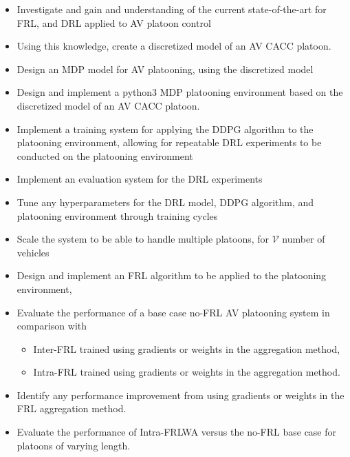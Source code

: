 \begin{itemize}
    \item Investigate and gain and understanding of the current state-of-the-art for FRL, and DRL
    applied to AV platoon control
    \item Using this knowledge, create a discretized model of an AV CACC platoon.
    \item Design an MDP model for AV platooning, using the discretized model
    \item Design and implement a python3 MDP platooning environment based on the discretized model of an AV
    CACC platoon.
    \item Implement a training system for applying the DDPG algorithm to the platooning
    environment, allowing for repeatable DRL experiments to be conducted on the platooning environment
    \item Implement an evaluation system for the DRL experiments
    \item Tune any hyperparameters for the DRL model, DDPG algorithm, and platooning environment
    through training cycles
    \item Scale the system to be able to handle multiple platoons, for $\mathcal{V}$ number of
    vehicles
    \item Design and implement an FRL algorithm to be applied to the platooning
    environment,
    \item Evaluate the performance of a base case no-FRL AV platooning system in
    comparison with
        \begin{itemize}
            \item Inter-FRL trained using gradients or weights in the aggregation method,
            \item Intra-FRL trained using gradients or weights in the aggregation method.
        \end{itemize}
    \item Identify any performance improvement from using gradients or weights in the
    FRL aggregation method.
    \item Evaluate the performance of Intra-FRLWA versus the no-FRL base case for
    platoons of varying length.
\end{itemize}

